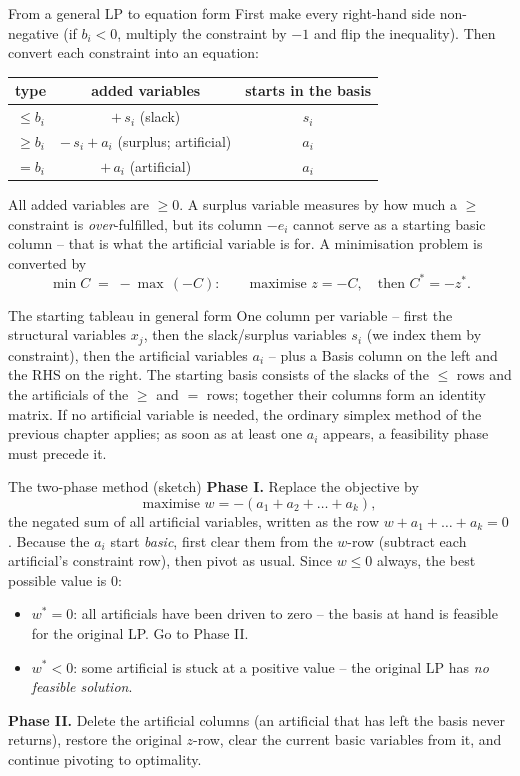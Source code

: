 \begin{rulebox}{From a general LP to equation form}
First make every right-hand side non-negative (if $b_{i}<0$, multiply the
constraint by $-1$ and flip the inequality). Then convert each constraint
into an equation:
\begin{center}
\begin{tabular}{c|c|c}
type & added variables & starts in the basis\\
\hline
$\le b_{i}$ & $+\,s_{i}$ \quad (slack) & $s_{i}$\\
$\ge b_{i}$ & $-\,s_{i}+a_{i}$ \quad (surplus;
              artificial) & $a_{i}$\\
$= b_{i}$ & $+\,a_{i}$ \quad (artificial)
            & $a_{i}$\\
\end{tabular}
\end{center}
All added variables are $\ge 0$. A surplus variable measures by how much a
$\ge$ constraint is \emph{over}-fulfilled, but its column $-e_{i}$ cannot
serve as a starting basic column -- that is what the artificial variable is
for. A minimisation problem is converted by
\[
  \min C \;=\; -\max\,(-C):
  \qquad\text{maximise } z=-C,\quad\text{then } C^{*}=-z^{*}.
\]
\end{rulebox}

\begin{rulebox}{The starting tableau in general form}
One column per variable -- first the structural variables $x_{j}$, then the
slack/surplus variables $s_{i}$ (we index them by constraint), then the
artificial variables $a_{i}$ -- plus a Basis column on the left and the RHS
on the right. The starting basis consists of the slacks of the $\le$ rows
and the artificials of the $\ge$ and $=$ rows; together their columns form
an identity matrix. If no artificial variable is needed, the ordinary
simplex method of the previous chapter applies; as soon as at least one
$a_{i}$ appears, a feasibility phase must precede it.
\end{rulebox}

\begin{rulebox}{The two-phase method (sketch)}
\textbf{Phase I.} Replace the objective by
\[
  \text{maximise } w=-(a_{1}+a_{2}+\dots+a_{k}),
\]
the negated sum of all artificial variables, written as the row
$w+a_{1}+\dots+a_{k}=0$. Because the $a_{i}$ start \emph{basic}, first clear
them from the $w$-row (subtract each artificial's constraint row), then
pivot as usual. Since $w\le 0$ always, the best possible value is $0$:
\begin{itemize}[leftmargin=1.6em,itemsep=0.3ex]
  \item $w^{*}=0$: all artificials have been driven to zero -- the basis at
        hand is feasible for the original LP. Go to Phase II.
  \item $w^{*}<0$: some artificial is stuck at a positive value -- the
        original LP has \emph{no feasible solution}.
\end{itemize}
\textbf{Phase II.} Delete the artificial columns (an artificial that has
left the basis never returns), restore the original $z$-row, clear the
current basic variables from it, and continue pivoting to optimality.
\end{rulebox}

